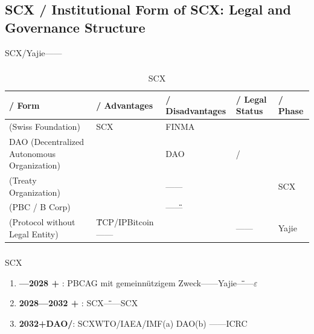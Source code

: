 \documentclass[12pt,a4paper]{article}
\theoremstyle{remark}
\begin{document}
\subsection{SCX / Institutional Form of SCX: Legal and Governance Structure}

SCX/Yajie——

\subsubsection{}

\begin{table}[H]
\centering
\begin{tabular}{p{2.5cm} p{3cm} p{3cm} p{3cm} p{3cm}}
    \toprule
    \textbf{ / Form} & \textbf{ / Advantages} & \textbf{ / Disadvantages} & \textbf{ / Legal Status} & \textbf{ / Phase} \\
    \midrule
     (Swiss Foundation) & SCX & FINMA &  &  \\
    \midrule
    DAO (Decentralized Autonomous Organization) &  & DAO & / &  \\
    \midrule
     (Treaty Organization) &  & —— &  & SCX \\
    \midrule
     (PBC / B Corp) &  & ——\"\" &  &  \\
    \midrule
     (Protocol without Legal Entity) & \"\"TCP/IPBitcoin—— &  & —— & Yajie \\
    \bottomrule
\end{tabular}
\caption{SCX}
\end{table}

\subsubsection{}

SCX

\begin{enumerate}[label=(\arabic*)]
    \item \textbf{—2028 + }: PBCAG mit gemeinnützigem Zweck——Yajie\"\"——$\varepsilon$
    
    \item \textbf{2028—2032 + }: SCX\"\"——SCX
    
    \item \textbf{2032+DAO/}: SCXWTO/IAEA/IMF(a) DAO(b) ——ICRC
\end{enumerate}

\subsubsection{}
\end{document}
